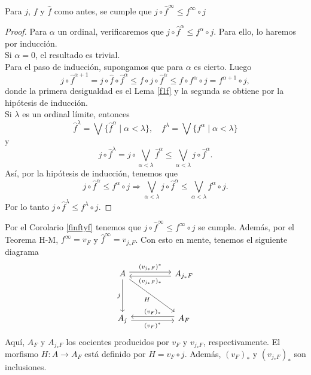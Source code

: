 \begin{cor}\label{finftyf}
    Para $j$, $f$ y $\hat{f}$ como antes, se cumple que $j\circ \hat{f}^\infty\leq f^\infty\circ j$
\end{cor}

\begin{proof}
    Para $\alpha$ un ordinal, verificaremos que $j\circ \hat{f}^\alpha\leq f^\alpha\circ j$. Para ello, lo haremos por inducción.\\

    Si $\alpha=0$, el resultado es trivial.\\

    Para el paso de inducción, supongamos que para $\alpha$ es cierto. Luego
    \[
    j\circ \hat{f}^{\alpha+1}=j\circ \hat{f}\circ \hat{f}^{\alpha}\leq  f\circ j\circ \hat{f}^\alpha\leq f\circ f^\alpha\circ j=f^{\alpha+1}\circ j,
    \]
    donde la primera desigualdad es el Lema \ref{f1f} y la segunda se obtiene por la hipótesis de inducción.\\

    Si $\lambda$ es un ordinal límite, entonces
	\[
	\hat{f}^\lambda=\bigvee\{\hat{f}^\alpha\mid \alpha<\lambda\}, \quad f^\lambda=\bigvee\{f^\alpha\mid \alpha<\lambda\} 
	\]
	y
	\[
		j\circ \hat{f}^\lambda=j\circ \bigvee_{\alpha<\lambda}\hat{f}^\alpha\leq\bigvee_{\alpha<\lambda}j\circ \hat{f}^\alpha.
	\]
	Así, por la hipótesis de inducción, tenemos que
	\[
	j\circ \hat{f}^\alpha\leq f^\alpha\circ j\Rightarrow \bigvee_{\alpha<\lambda}j\circ \hat{f}^\alpha\leq \bigvee_{\alpha<\lambda} f^\alpha\circ j.
	\]
	Por lo tanto $j\circ \hat{f}^\lambda\leq f^\lambda\circ j$.
\end{proof}

Por el Corolario \ref{finftyf} tenemos que $j\circ \hat{f}^\infty\leq f^\infty\circ j$ se cumple. Además, por el Teorema H-M, $f^\infty=v_F$ y $\hat{f}^\infty=v_{j_*F}$. Con esto en mente, tenemos el siguiente diagrama
\[\begin{tikzcd}
	A && {A_{j_*F}} \\
	\\
	{A_j} && {A_F}
	\arrow["{(v_{j_*F})^*}", shift left, from=1-1, to=1-3]
	\arrow["j"', from=1-1, to=3-1]
	\arrow["H"', from=1-1, to=3-3]
	\arrow["{(v_{j_*F})_*}", shift left, from=1-3, to=1-1]
	\arrow["{(v_F)^*}"', shift right, from=3-1, to=3-3]
	\arrow["{(v_F)_*}"', shift right, from=3-3, to=3-1]
\end{tikzcd}\]
Aquí, $A_F$ y $A_{j_*F}$ los cocientes producidos por $v_F$ y $v_{j_*F}$, respectivamente. El morfismo $H\colon A\to A_F$ está definido por $H=v_F\circ j$. Además, $(v_F)_*$ y $(v_{j_*F})_*$ son inclusiones.\\

